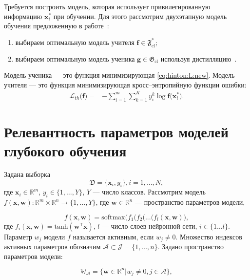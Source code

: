 Требуется построить модель, которая использует привилегированную информацию $\mathbf{x}^*_i$ при обучении. Для этого рассмотрим двухэтапную модель обучения предложенную в работе~\cite{Lopez2016}:
\begin{enumerate}
    \item выбираем оптимальную модель учителя $\mathbf{f} \in \mathfrak{F}_{\text{cl}}^*$;
    \item выбираем оптимальную модель ученика $\mathbf{g} \in \mathfrak{G}_{\text{cl}}$ используя дистилляцию~\cite{Hinton2015}. 
\end{enumerate}

Модель ученика --- это функция минимизирующая \eqref{eq:hinton:L:new}. Модель учителя --- это функция минимизирующая кросс--энтропийную функции ошибки:
\[
\label{eq:hinton.2}
\begin{aligned}
   \mathcal{L}_{th}\bigr(\mathbf{f}\bigr) = &-\sum_{i=1}^{m}{{\sum_{k=1}^{K}y^k_i\log\mathbf{f}\bigr(\mathbf{x}^*_i\bigr)}}.
   \end{aligned}
\]

\section{Релевантность параметров моделей глубокого обучения}

Задана выборка
\[
\label{2.1}
\mathfrak{D} = \{\textbf{x}_i,y_i\},  i =1,...,N,
\]
где $\textbf{x}_i \in \mathbb{R}^{m}$, $y_i \in \{1, \dots, Y\}$, $Y$ --- число классов.
Рассмотрим модель $f(\mathbf{x}, \mathbf{w}): \mathbb{R}^m \times \mathbb{R}^n \to \{1,\dots,Y\}$, где $\textbf{w} \in \mathbb{R}^n$ --- пространство параметров модели,

\[
\label{2.2}
f(\mathbf{x}, \mathbf{w}) = \text{softmax}\bigl( f_1(f_2(...(f_l(\mathbf{x}, \mathbf{w})\bigr),
\]
где $f_i(\mathbf{x}, \mathbf{w}) =  \text{tanh}(\mathbf{w}^\mathsf{T}\mathbf{x})$, $l$ --- число слоев нейронной сети, $i \in \{1\dots l\}$.
Параметр $w_j$ модели $f$  называется активным, если $w_j \not = 0$. Множество индексов активных параметров обозначим $\mathcal{A} \subset \mathcal{J} = \{1,...,n\}$.
Задано пространство параметров модели:

\[
\label{2.3}
\mathbb{W_\mathcal{A}} = \{ \textbf{w} \in \mathbb{R}^n | w_j\not=0, j \in \mathcal{A}  \},
\]


